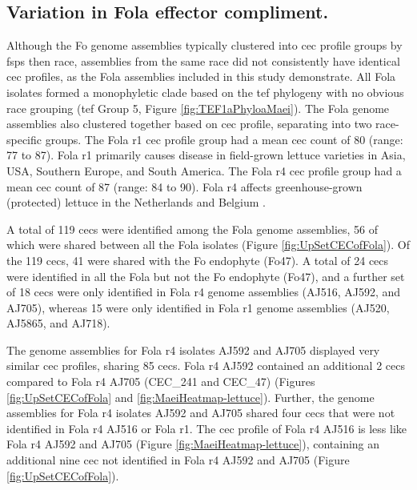 \subsection{Variation in \acl{Fola} effector compliment.}

Although the \ac{Fo} genome assemblies typically clustered into \ac{cec} profile groups by \acp{fsp} then race, assemblies from the same race did not consistently have identical \ac{cec} profiles, as the \ac{Fola} assemblies included in this study demonstrate. All \ac{Fola} isolates formed a monophyletic clade based on the \ac{tef} phylogeny with no obvious race grouping (\ac{tef} Group 5, Figure \ref{fig:TEF1aPhyloaMaei}). The \ac{Fola} genome assemblies also clustered together based on \ac{cec} profile, separating into two race-specific groups. The \ac{Fola} \ac{r1} \ac{cec} profile group had a mean \ac{cec} count of 80 (range: 77 to 87). \ac{Fola} \ac{r1} primarily causes disease in field-grown lettuce varieties in Asia, USA, Southern Europe, and South America. The \ac{Fola} \ac{r4} \ac{cec} profile group had a mean \ac{cec} count of 87  (range: 84 to 90). \ac{Fola} \ac{r4} affects greenhouse-grown (protected) lettuce in the Netherlands and Belgium \parencite{Mestdagh2023}. 

A total of 119 \acp{cec} were identified among the \ac{Fola} genome assemblies, 56 of which were shared between all the \ac{Fola} isolates (Figure \ref{fig:UpSetCECofFola}). Of the 119 \acp{cec}, 41 were shared with the \ac{Fo} endophyte (Fo47). A total of 24 \acp{cec} were identified in all the \ac{Fola} but not the \ac{Fo} endophyte (Fo47), and a further set of 18 \acp{cec} were only identified in \ac{Fola} \ac{r4} genome assemblies (AJ516, AJ592, and AJ705), whereas 15 were only identified in \ac{Fola} \ac{r1} genome assemblies (AJ520, AJ5865, and AJ718). 

The genome assemblies for \ac{Fola} \ac{r4} isolates AJ592 and AJ705 displayed very similar \ac{cec} profiles, sharing 85 \acp{cec}. \ac{Fola} \ac{r4}  AJ592 contained an additional 2 \acp{cec} compared to \ac{Fola} \ac{r4}  AJ705 (CEC\_241 and CEC\_47) (Figures \ref{fig:UpSetCECofFola} and \ref{fig:MaeiHeatmap-lettuce}).  Further, the genome assemblies for \ac{Fola} \ac{r4} isolates  AJ592 and AJ705 shared four \acp{cec} that were not identified in \ac{Fola} \ac{r4}  AJ516 or \ac{Fola} \ac{r1}. The \ac{cec} profile of \ac{Fola} \ac{r4}  AJ516 is less like \ac{Fola} \ac{r4} AJ592 and AJ705 (Figure \ref{fig:MaeiHeatmap-lettuce}), containing an additional nine \ac{cec} not identified in \ac{Fola} \ac{r4} AJ592 and AJ705 (Figure \ref{fig:UpSetCECofFola}). 

